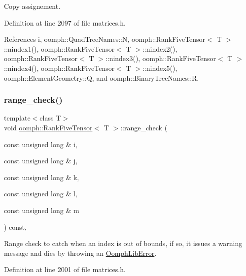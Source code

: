 Copy assignement. 



Definition at line 2097 of file matrices.\+h.



References i, oomph\+::\+Quad\+Tree\+Names\+::N, oomph\+::\+Rank\+Five\+Tensor$<$ T $>$\+::nindex1(), oomph\+::\+Rank\+Five\+Tensor$<$ T $>$\+::nindex2(), oomph\+::\+Rank\+Five\+Tensor$<$ T $>$\+::nindex3(), oomph\+::\+Rank\+Five\+Tensor$<$ T $>$\+::nindex4(), oomph\+::\+Rank\+Five\+Tensor$<$ T $>$\+::nindex5(), oomph\+::\+Element\+Geometry\+::Q, and oomph\+::\+Binary\+Tree\+Names\+::R.

\mbox{\label{classoomph_1_1RankFiveTensor_a8fce9375f99c153e3d5b91193996dad8}} 
\subsubsection{\texorpdfstring{range\+\_\+check()}{range\_check()}}
{\footnotesize\ttfamily template$<$class T$>$ \\
void \hyperlink{classoomph_1_1RankFiveTensor}{oomph\+::\+Rank\+Five\+Tensor}$<$ T $>$\+::range\+\_\+check (\begin{DoxyParamCaption}\item[{const unsigned long \&}]{i,  }\item[{const unsigned long \&}]{j,  }\item[{const unsigned long \&}]{k,  }\item[{const unsigned long \&}]{l,  }\item[{const unsigned long \&}]{m }\end{DoxyParamCaption}) const\hspace{0.3cm}{\ttfamily [inline]}, {\ttfamily [private]}}



Range check to catch when an index is out of bounds, if so, it issues a warning message and dies by throwing an {\ttfamily \hyperlink{classoomph_1_1OomphLibError}{Oomph\+Lib\+Error}}. 



Definition at line 2001 of file matrices.\+h.

\mbox{\label{classoomph_1_1RankFiveTensor_aa349a95c9ee9aa66950f1ed88532498c}} 

